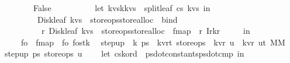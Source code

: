 \begin{isabellebody}
\ \ \ \ \ \ {\isacharbar}\ False\ {\isasymRightarrow}\ {\isacharparenleft}\isanewline
\ \ \ \ \ \ \ \ let\ {\isacharparenleft}kvs{}{\isacharcomma}k{\isacharprime}{\isacharcomma}kvs{}{\isacharparenright}\ {\isacharequal}\ split{\isacharunderscore}leaf\ cs\ kvs{\isacharprime}\ in\isanewline
\ \ \ \ \ \ \ \ Disk{\isacharunderscore}leaf\ kvs{}\ {\isacharbar}{\isachargreater}\ {\isacharparenleft}store{\isacharunderscore}ops{\isacharbar}{\isachargreater}store{\isacharunderscore}alloc{\isacharparenright}\ {\isacharbar}{\isachargreater}\ bind\isanewline
\ \ \ \ \ \ \ \ {\isacharparenleft}{\isacharpercent}\ r{}{\isachardot}\ Disk{\isacharunderscore}leaf\ kvs{}\ {\isacharbar}{\isachargreater}\ {\isacharparenleft}store{\isacharunderscore}ops{\isacharbar}{\isachargreater}store{\isacharunderscore}alloc{\isacharparenright}\ {\isacharbar}{\isachargreater}\ fmap\ {\isacharparenleft}{\isacharpercent}\ r{}{\isachardot}\ I{}{\isacharparenleft}r{}{\isacharcomma}k{\isacharprime}{\isacharcomma}r{}{\isacharparenright}{\isacharparenright}{\isacharparenright}{\isacharparenright}\ {\isacharparenright}\isanewline
\ \ \ \ in\isanewline
\ \ \ \ fo\ {\isacharbar}{\isachargreater}\ fmap\ {\isacharparenleft}{\isacharpercent}\ fo{\isachardot}\ {\isacharparenleft}fo{\isacharcomma}stk{\isacharparenright}{\isacharparenright}{\isacharparenright}{\isacharparenright}\ {\isacharparenright}{\isachardoublequoteclose}\isanewline
\isanewline
\isanewline
{}\isamarkupfalse%
\ step{\isacharunderscore}up\ {\isacharcolon}{\isacharcolon}\ {\isachardoublequoteopen}{\isacharprime}k\ ps{}\ {\isasymRightarrow}\ {\isacharparenleft}{\isacharprime}k{\isacharcomma}{\isacharprime}v{\isacharcomma}{\isacharprime}r{\isacharcomma}{\isacharprime}t{\isacharparenright}\ store{\isacharunderscore}ops\ {\isasymRightarrow}\ {\isacharparenleft}{\isacharprime}k{\isacharcomma}{\isacharprime}v{\isacharcomma}{\isacharprime}r{\isacharparenright}\ u\ {\isasymRightarrow}\ {\isacharparenleft}{\isacharparenleft}{\isacharprime}k{\isacharcomma}{\isacharprime}v{\isacharcomma}{\isacharprime}r{\isacharparenright}\ u{\isacharcomma}{\isacharprime}t{\isacharparenright}\ MM{\isachardoublequoteclose}\ \isanewline
{\isachardoublequoteopen}step{\isacharunderscore}up\ ps{}\ store{\isacharunderscore}ops\ u\ {\isacharequal}\ {\isacharparenleft}\isanewline
\ \ let\ {\isacharparenleft}cs{\isacharcomma}k{\isacharunderscore}ord{\isacharparenright}\ {\isacharequal}\ {\isacharparenleft}ps{}{\isacharbar}{\isachargreater}dot{\isacharunderscore}constants{\isacharcomma}ps{}{\isacharbar}{\isachargreater}dot{\isacharunderscore}cmp{\isacharparenright}\ in\isanewline

\end{isabellebody}
